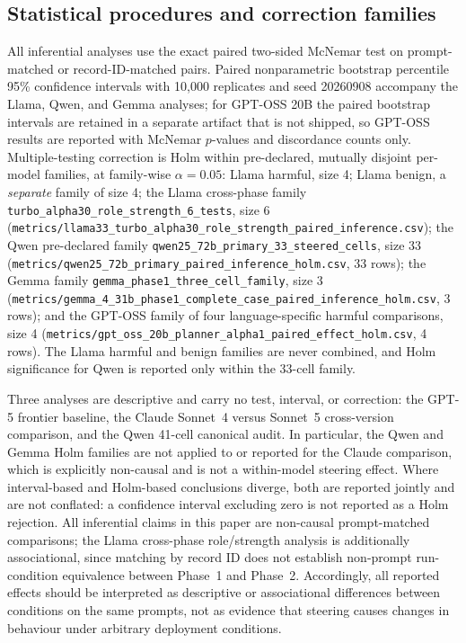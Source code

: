 \subsection{Statistical procedures and correction families}

All inferential analyses use the exact paired two-sided McNemar test on
prompt-matched or record-ID-matched pairs. Paired nonparametric bootstrap
percentile 95\% confidence intervals with 10{,}000 replicates and seed 20260908
accompany the Llama, Qwen, and Gemma analyses; for GPT-OSS 20B the paired
bootstrap intervals are retained in a separate artifact that is not shipped, so
GPT-OSS results are reported with McNemar $p$-values and discordance counts
only. Multiple-testing correction is Holm within pre-declared, mutually disjoint
per-model families, at family-wise $\alpha = 0.05$: Llama harmful, size 4;
Llama benign, a \emph{separate} family of size 4; the Llama cross-phase family
\texttt{turbo\_alpha30\_role\_strength\_6\_tests}, size 6
(\texttt{metrics/llama33\_turbo\_alpha30\_role\_strength\_paired\_inference.csv});
the Qwen pre-declared family \texttt{qwen25\_72b\_primary\_33\_steered\_cells},
size 33
(\texttt{metrics/qwen25\_72b\_primary\_paired\_inference\_holm.csv}, 33 rows);
the Gemma family \texttt{gemma\_phase1\_three\_cell\_family}, size 3
(\texttt{metrics/gemma\_4\_31b\_phase1\_complete\_case\_paired\_inference\_holm.csv},
3 rows); and the GPT-OSS family of four language-specific harmful comparisons,
size 4
(\texttt{metrics/gpt\_oss\_20b\_planner\_alpha1\_paired\_effect\_holm.csv},
4 rows). The Llama harmful and benign families are never combined, and Holm
significance for Qwen is reported only within the 33-cell family.

Three analyses are descriptive and carry no test, interval, or correction: the
GPT-5 frontier baseline, the Claude Sonnet~4 versus Sonnet~5 cross-version
comparison, and the Qwen 41-cell canonical audit. In particular, the Qwen and
Gemma Holm families are not applied to or reported for the Claude comparison,
which is explicitly non-causal and is not a within-model steering effect. Where
interval-based and Holm-based conclusions diverge, both are reported jointly and
are not conflated: a confidence interval excluding zero is not reported as a
Holm rejection. All inferential claims in this paper are non-causal
prompt-matched comparisons; the Llama cross-phase role/strength analysis is
additionally associational, since matching by record ID does not establish
non-prompt run-condition equivalence between Phase~1 and Phase~2. Accordingly,
all reported effects should be interpreted as descriptive or associational
differences between conditions on the same prompts, not as evidence that
steering causes changes in behaviour under arbitrary deployment conditions.

